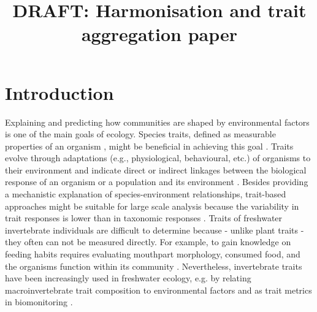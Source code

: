 \documentclass{article}
\title{DRAFT: Harmonisation and trait aggregation paper }
\author{}%
\date{}
\begin{document}
\maketitle

\section*{Introduction}

Explaining and predicting how communities are shaped by environmental factors is one of the main goals of ecology. Species traits, defined as measurable properties of an organism \cite{mcgill_rebuilding_2006}, might be beneficial in achieving this goal \cite{heino_jani_macroecological_2013}. Traits evolve through adaptations (e.g., physiological, behavioural, etc.) of organisms to their environment and indicate direct or indirect linkages between the biological response of an organism or a population and its environment \cite{southwood_habitat_1977, verberk_delivering_2013}.
Besides providing a mechanistic explanation of species-environment relationships, trait-based approaches might be suitable for large scale analysis because the variability in trait responses is lower than in taxonomic responses \cite{bonada_taxonomic_2007, baird_toward_2011}. Traits of freshwater invertebrate individuals are difficult to determine because - unlike plant traits - they often can not be measured directly. For example, to gain knowledge on feeding habits requires evaluating mouthpart morphology, consumed food, and the organisms function within its community \cite{moog_comprehensive_nodate}. Nevertheless, invertebrate traits have been increasingly used in freshwater ecology, e.g. by relating macroinvertebrate trait composition to environmental factors and as trait metrics in biomonitoring \cite{poff_developing_2010, szocs_effects_2014, bhowmik_large_2015, menezes_beyond_2010}.
\end{document}
